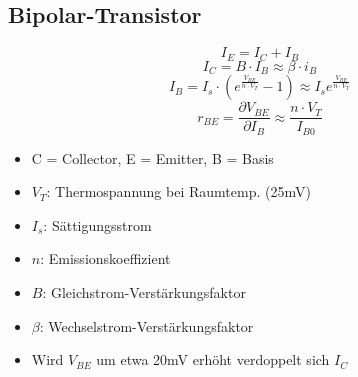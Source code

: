 \documentclass[margin=normal]{tex/hsrzf}
\begin{document}
\newpage
\begin{minipage}{0.49\textwidth}
  \subsection{Bipolar-Transistor}
  $$I_E = I_C+I_B$$
  $$I_C = B\cdot I_B \approx \beta \cdot i_B$$
  $$I_B= I_s \cdot(e^{\frac{V_{BE}}{n \cdot V_T}}-1) \approx I_s e^{\frac{V_{BE}}{n \cdot V_T}}$$
  $$r_{BE} = \frac{\partial V_{BE}}{\partial I_B} \approx \frac{n \cdot V_T}{I_{B0}} $$

  {\tiny \begin{itemize}[leftmargin=*]
        \item C = Collector, E = Emitter, B = Basis
        \item $V_T$: Thermospannung bei Raumtemp. (25mV)
        \item $I_s$: Sättigungsstrom
        \item  $n$: Emissionskoeffizient
        \item $B$: Gleichstrom-Verstärkungsfaktor
        \item $\beta$: Wechselstrom-Verstärkungsfaktor
        \item Wird $V_{BE}$ um etwa 20mV erhöht verdoppelt sich $I_C$
      \end{itemize}}
\end{minipage}%
\end{document}

